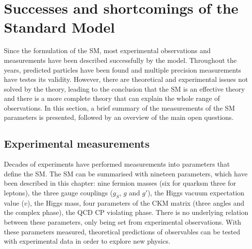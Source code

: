 \section{Successes and shortcomings of the Standard Model}

Since the formulation of the SM, most experimental observations and measurements have been described successfully by the model. Throughout the years, predicted particles have been found and multiple precision measurements have testes its validity. However, there are theoretical and experimental issues not solved by the theory, leading to the conclusion that the SM is an effective theory and there is a more complete theory that can explain the whole range of observations. In this section, a brief summary of the measurements of the SM parameters is presented, followed by an overview of the main open questions. 

\subsection{Experimental measurements}

Decades of experiments have performed measurements into parameters that define the SM. The SM can be summarised with nineteen parameters, which have been described in this chapter: nine fermion masses (six for quarksm three for leptons), the three gauge couplings ($g_S$, $g$ and $g'$), the Higgs vacuum expectation value ($v$), the Higgs mass, four parameters of the CKM matrix (three angles and the complex phase), the QCD CP violating phase. There is no underlying relation between these parameters, only being set from experimental observations. With these parameters measured, theoretical predictions of observables can be tested with experimental data in order to explore new physics.\\

